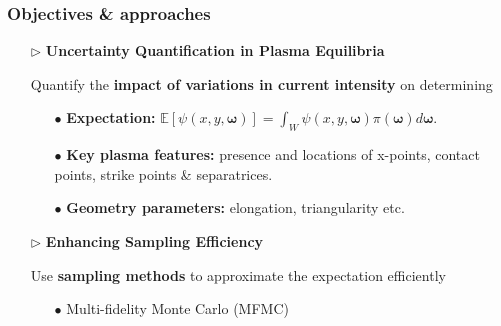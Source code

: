 \documentclass{beamer}
\begin{document}
\begin{frame}[t]
    \frametitle{Objectives \& approaches}
        \begin{itemize}[leftmargin=5pt] 
            
            \item[$\triangleright$] \textcolor{myblue3}{\bf Uncertainty Quantification in Plasma Equilibria} 
            
            {\fontsize{9}{9}\selectfont
            Quantify the {\bf impact of variations in current intensity} on determining 
            \begin{itemize}[leftmargin=15pt]     
                \item[\textcolor{myblue3}{$\bullet$}]   {\bf Expectation:}
                $\mathbb{E}\left[\psi(x,y,\boldsymbol \omega)\right]=\int_W \psi(x,y,\boldsymbol{\omega})\pi(\boldsymbol\omega)d\boldsymbol{\omega}.$
            
                \vspace{0.5mm}
                \item[\textcolor{myblue3}{$\bullet$}] {\bf Key plasma features:}  presence and locations of x-points, contact points, strike points \& separatrices.

                \vspace{0.5mm}
                \item[\textcolor{myblue3}{$\bullet$}]  {\bf Geometry parameters:} elongation, triangularity etc.
                
            \end{itemize}
            }
            \vspace{2mm}
            \item[$\triangleright$] \textcolor{myblue3}{\bf Enhancing Sampling Efficiency}
            
            {\fontsize{9}{9}\selectfont
            Use {\bf sampling methods} to approximate the expectation efficiently
            \begin{itemize}[leftmargin=15pt] 
                \item[\textcolor{myblue3}{$\bullet$}] \textcolor{myblue3}{Multi-fidelity Monte Carlo (MFMC)}
                

\end{itemize}}
\end{itemize}
\end{frame}
\end{document}
